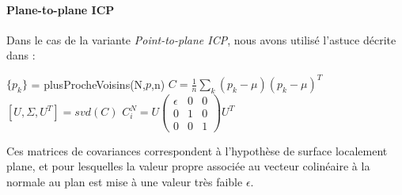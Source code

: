 \paragraph{Plane-to-plane ICP}

Dans le cas de la variante \textit{Point-to-plane ICP}, nous avons utilisé l'astuce décrite dans \cite{bib_gicp} : \\


\begin{algorithm}[H]
$\{p_{k}\}$ = plusProcheVoisins(N,$p$,n)\;
$C = \frac{1}{n}\sum_{k}{(p_{k}-\mu)(p_{k}-\mu)^{T}}$\;
$[U,\Sigma,U^{T}] = svd(C)$\;
$C_{i}^{N} = U\begin{pmatrix}
\epsilon & 0 & 0\\
0 & 1 & 0\\
0 & 0 & 1
\end{pmatrix}U^{T}$
\end{algorithm}

Ces matrices de covariances correspondent à l'hypothèse de surface localement plane, et pour lesquelles la valeur propre associée au vecteur colinéaire à la normale au plan est mise à une valeur très faible $\epsilon$.